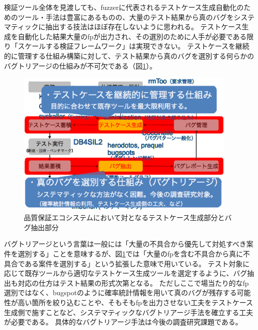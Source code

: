 検証ツール全体を見渡しても、\acrshort{fuzzer}に代表されるテストケース生成自動化のためのツール・手法は豊富にあるものの、大量のテスト結果から真のバグをシステマティックに抽出する技法はほぼ存在しないように思われる。
テストケース生成を自動化した結果大量の\acrshort{fp}が出力され、その選別のために人手が必要である限り「スケールする検証フレームワーク」は実現できない。
テストケースを継続的に管理する仕組み構築に対して、テスト結果から真のバグを選別する何らかのバグトリアージの仕組みが不可欠である（図\ref{eco}）。
\begin{figure}[ht]
  \centering
  \includegraphics[width=0.95\textwidth]{pic/eco.eps}
  \caption{品質保証エコシステムにおいて対となるテストケース生成部分とバグ抽出部分}
  \label{eco}
\end{figure}
\par
バグトリアージという言葉は一般には「大量の不具合から優先して対処すべき案件を選別する」ことを意味するが、図\ref{eco}では「大量の\acrshort{fp}を含む不具合から真に不具合である案件を選別する」という拡張した意味で用いている。
テスト対象に応じて既存ツールから適切なテストケース生成ツールを選定するように、バグ抽出も対応の仕方はテスト結果の形式次第となる。
ただしここで場当たり的な\acrshort{fp}選別ではなく、\acrshort{bugspot}のように確率統計情報を用いて真のバグが残存する可能性が高い箇所を絞り込むことや、そもそも\acrshort{fp}を出力させない工夫をテストケース生成側で施すことなど、システマティックなバグトリアージ手法を確立する工夫が必要である。
具体的なバグトリアージ手法は今後の調査研究課題である。
